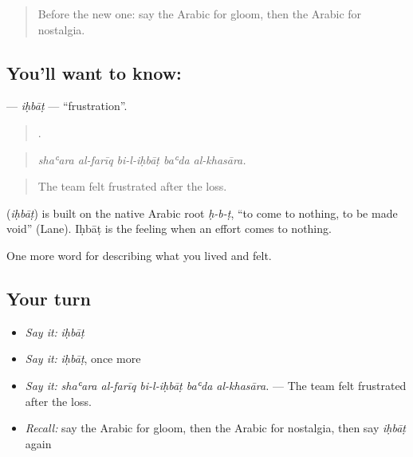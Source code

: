 \label{lesson:AR-C494-ihbat}



\begin{quote}
Before the new one: say the Arabic for gloom, then the Arabic for nostalgia.
\end{quote}

\subsection*{You'll want to know: }
\textbf{} — \emph{iḥbāṭ} — \textquotedblleft{}frustration\textquotedblright{}.

\begin{quote}
    .
\end{quote}

\begin{quote}
\emph{shaʿara al-farīq bi-l-iḥbāṭ baʿda al-khasāra.}
\end{quote}

\begin{quote}
The team felt frustrated after the loss.
\end{quote}

\begin{cousinweb}
\textbf{} (\emph{iḥbāṭ}) is built on the native Arabic root \emph{ḥ-b-ṭ}, \textquotedblleft{}to come to nothing, to be made void\textquotedblright{} (Lane). Iḥbāṭ is the feeling when an effort comes to nothing.
\end{cousinweb}

\begin{grammarlens}[title={What you've built}]
One more word for describing what you lived and felt.
\end{grammarlens}

\subsection*{Your turn}
\begin{itemize}
\raggedright
  \item \emph{Say it:} \emph{iḥbāṭ}
  \item \emph{Say it:} \emph{iḥbāṭ}, once more
  \item \emph{Say it:} \emph{shaʿara al-farīq bi-l-iḥbāṭ baʿda al-khasāra.} — The team felt frustrated after the loss.
  \item \emph{Recall:} say the Arabic for gloom, then the Arabic for nostalgia, then say \emph{iḥbāṭ} again
\end{itemize}

